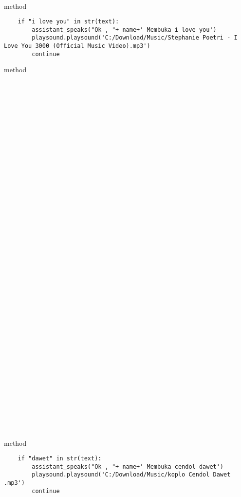 \\
\\
\\
\\
\\
\\
\\
\\
\\
\\
\\
 method 
 \begin{lstlisting}
    if "i love you" in str(text):
        assistant_speaks("Ok , "+ name+' Membuka i love you')
        playsound.playsound('C:/Download/Music/Stephanie Poetri - I Love You 3000 (Official Music Video).mp3')
        continue

 \end{lstlisting}
  method 
\\
\\
\\
\\
\\
\\
\\
\\
\\
\\
\\
\\
\\
\\
\\
\\
\\
\\
\\
\\
\\
\\
\\
\\
\\
\\
\\
\\
\\
\\
\\
\\
\\
\\
\\
\\
\\
\\
\\
 method 
 \begin{lstlisting}
    if "dawet" in str(text):
        assistant_speaks("Ok , "+ name+' Membuka cendol dawet')
        playsound.playsound('C:/Download/Music/koplo Cendol Dawet .mp3')
        continue
 \end{lstlisting}
